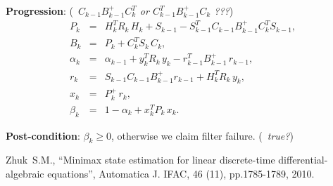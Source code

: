 \documentclass[]{article}
\newcommand{\TODO}[1]{({\bf{\color{red}{TODO:}}}\,\,\,{\footnotesize\it{#1}})}
\begin{document}
\noindent\textbf{Progression}: \TODO{$C_{k-1} B_{k-1}^{+} C_k^T$  or  $C_{k-1}^T B_{k-1}^{+} C_k$ ???}
\begin{eqnarray}
P_k      &=& H_k^T R_k \, H_k + S_{k-1} - S_{k-1}^T C_{k-1} B_{k-1}^{+} C_k^T S_{k-1},   \\
B_k      &=& P_k + C_k^T S_k \, C_k, \\
\alpha_k &=& \alpha_{k-1} + y_k^T R_k \, y_k - r_{k-1}^T B_{k-1}^{+} \, r_{k-1}, \\
r_k      &=& S_{k-1} C_{k-1} B_{k-1}^{+} r_{k-1} + H_k^T R_k \, y_k, \\
x_k      &=& P_k^{+} \, r_k, \\
\beta_k  &=& 1 - \alpha_k + x_k^T P_k \, x_k.
\end{eqnarray}

\noindent\textbf{Post-condition}: $\beta_k \ge 0$, otherwise we claim filter failure. \TODO{true?}

\begin{thebibliography}{1}
 Zhuk~S.M., ``Minimax state estimation for linear discrete-time differential-algebraic equations'', Automatica J. IFAC, 46 (11), pp.1785-1789, 2010.
\end{thebibliography}
\end{document}
